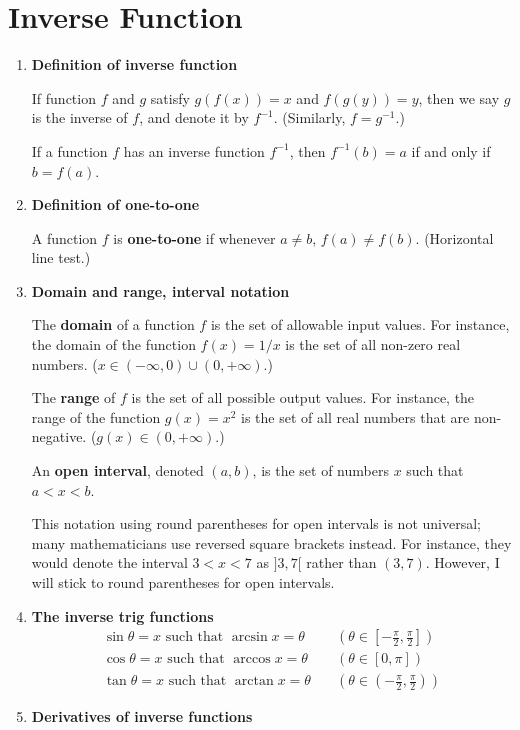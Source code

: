 \section{Inverse Function}
\begin{enumerate}
    \item \textbf{Definition of inverse function}

        If function $f$ and $g$ satisfy $g(f(x))=x$ and $f(g(y))=y$, then we say $g$ is the inverse of $f$, and denote it by $f^{-1}$. (Similarly, $f=g^{-1}$.)

        If a function $f$ has an inverse function $f^{-1}$, then $f^{-1}(b)=a$ if and only if $b=f(a)$.
    \item \textbf{Definition of one-to-one}

        A function $f$ is \textbf{one-to-one} if whenever $a\neq b$, $f(a)\neq f(b)$. (Horizontal line test.)
    \item \textbf{Domain and range, interval notation}
        
        The \textbf{domain} of a function $f$ is the set of allowable input values. For instance, the domain of the function $f(x)=1/x$ is the set of all non-zero real numbers. ($x\in(-\infty,0)\cup(0,+\infty)$.)

        The \textbf{range} of $f$ is the set of all possible output values. For instance, the range of the function $g(x)=x^2$ is the set of all real numbers that are non-negative. ($g(x)\in(0,+\infty)$.)

        An \textbf{open interval}, denoted $(a,b)$, is the set of numbers $x$ such that $a<x<b$.

        This notation using round parentheses for open intervals is not universal; many mathematicians use reversed square brackets instead. For instance, they would denote the interval $3<x<7$ as $]3,7[$ rather than $(3,7)$. However, I will stick to round parentheses for open intervals.
    \item \textbf{The inverse trig functions}
        \begin{align*}
            \sin\theta=x \text{ such that } \arcsin x=\theta & \quad(\theta\in[-\frac{\pi}{2},\frac{\pi}{2}]) \\
            \cos\theta=x \text{ such that } \arccos x=\theta & \quad(\theta\in[0,\pi]) \\
            \tan\theta=x \text{ such that } \arctan x=\theta & \quad(\theta\in(-\frac{\pi}{2},\frac{\pi}{2}))
        \end{align*}
    \item \textbf{Derivatives of inverse functions}


\end{enumerate}
